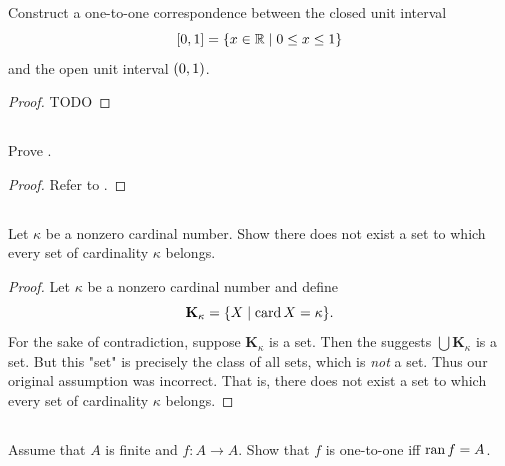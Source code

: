 \documentclass{report}
\begin{document}
\subsection{}%

  Construct a one-to-one correspondence between the closed unit interval
    $$\left[0, 1\right] = \{x \in \mathbb{R} \mid 0 \leq x \leq 1\}$$
    and the open unit interval $\left(0, 1\right)$.

  \begin{proof}
    TODO
  \end{proof}

\subsection{}%

  Prove .

  \begin{proof}
    Refer to .
  \end{proof}

\subsection{}%

  Let $\kappa$ be a nonzero cardinal number.
  Show there does not exist a set to which every set of cardinality $\kappa$
    belongs.

  \begin{proof}
    Let $\kappa$ be a nonzero cardinal number and define
      $$\mathbf{K}_\kappa = \{ X \mid \mathop{\text{card}}{X} = \kappa \}.$$
    For the sake of contradiction, suppose $\mathbf{K}_\kappa$ is a set.
    Then the  suggests $\bigcup \mathbf{K}_{\kappa}$ is
      a set.
    But this "set" is precisely the class of all sets, which is \textit{not} a
      set.
    Thus our original assumption was incorrect.
    That is, there does not exist a set to which every set of cardinality
      $\kappa$ belongs.
  \end{proof}

\subsection{}%

  Assume that $A$ is finite and $f \colon A \rightarrow A$.
  Show that $f$ is one-to-one iff $\mathop{\text{ran}}{f} = A$.
\end{document}
